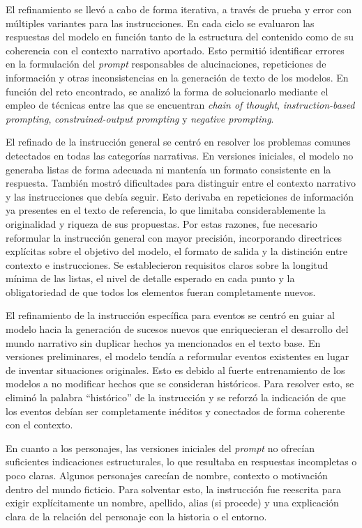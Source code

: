 El refinamiento se llevó a cabo de forma iterativa, a través de prueba y error con múltiples variantes para las instrucciones.
En cada ciclo se evaluaron las respuestas del modelo en función tanto de la estructura del contenido como de su coherencia
con el contexto narrativo aportado.
Esto permitió identificar errores en la formulación del \textit{prompt} responsables de alucinaciones,
repeticiones de información y otras inconsistencias en la generación de texto de los modelos.
En función del reto encontrado, se analizó la forma de solucionarlo mediante el empleo de técnicas
entre las que se encuentran \textit{chain of thought}, \textit{instruction-based prompting},
\textit{constrained-output prompting} y \textit{negative prompting}.

El refinado de la instrucción general se centró
en resolver los problemas comunes detectados en todas las categorías narrativas.
En versiones iniciales, el modelo no generaba listas de forma adecuada ni mantenía un formato consistente en la respuesta.
También mostró dificultades para distinguir entre el contexto narrativo y las instrucciones que debía seguir.
Esto derivaba en repeticiones de información ya presentes en el texto de referencia, lo que limitaba considerablemente
la originalidad y riqueza de sus propuestas.
Por estas razones, fue necesario reformular la instrucción general con mayor precisión,
incorporando directrices explícitas sobre el objetivo del modelo, el formato de salida
y la distinción entre contexto e instrucciones.
Se establecieron requisitos claros sobre la longitud mínima de las listas,
el nivel de detalle esperado en cada punto y la obligatoriedad de que todos los elementos fueran completamente nuevos.

El refinamiento de la instrucción específica para eventos se centró en guiar al modelo
hacia la generación de sucesos nuevos que enriquecieran el desarrollo del mundo narrativo
sin duplicar hechos ya mencionados en el texto base.
En versiones preliminares, el modelo tendía a reformular eventos existentes en lugar de inventar situaciones originales.
Esto es debido al fuerte entrenamiento de los modelos a no modificar hechos que se consideran históricos.
Para resolver esto, se eliminó la palabra ``histórico'' de la instrucción y
se reforzó la indicación de que los eventos debían ser completamente inéditos
y conectados de forma coherente con el contexto.

En cuanto a los personajes, las versiones iniciales del \textit{prompt} no ofrecían suficientes indicaciones estructurales,
lo que resultaba en respuestas incompletas o poco claras.
Algunos personajes carecían de nombre, contexto o motivación dentro del mundo ficticio.
Para solventar esto, la instrucción fue reescrita para exigir explícitamente un nombre, apellido,
alias (si procede) y una explicación clara de la relación del personaje con la historia o el entorno.

